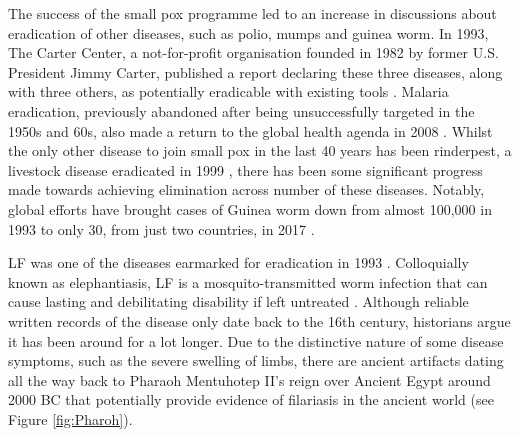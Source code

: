 The success of the small pox programme led to an increase in discussions about eradication of other diseases, such as polio, mumps and guinea worm. In 1993, The Carter Center, a not-for-profit organisation founded in 1982 by former U.S. President Jimmy Carter, published a report declaring these three diseases, along with three others, as potentially eradicable with existing tools \cite{Klepac2015}. Malaria eradication, previously abandoned after being unsuccessfully targeted in the 1950s and 60s, also made a return to the global health agenda in 2008 \cite{Feachem2008}. Whilst the only other disease to join small pox in the last 40 years has been rinderpest, a livestock disease eradicated in 1999 \cite{Morens2011}, there has been some significant progress made towards achieving elimination across number of these diseases. Notably, global efforts have brought cases of Guinea worm down from almost 100,000 in 1993 to only 30, from just two countries, in 2017 \cite{Molyneux2017}.

LF was one of the diseases earmarked for eradication in 1993 \cite{Klepac2015}. Colloquially known as elephantiasis, LF is a mosquito-transmitted worm infection that can cause lasting and debilitating disability if left untreated \cite{WHOLF}. Although reliable written records of the disease only date back to the 16th century, historians argue it has been around for a lot longer. Due to the distinctive nature of some disease symptoms, such as the severe swelling of limbs, there are ancient artifacts dating all the way back to Pharaoh Mentuhotep II's reign over Ancient Egypt around 2000 BC that potentially provide evidence of filariasis in the ancient world \cite{Kenawy2015} (see Figure \ref{fig:Pharoh}). 

